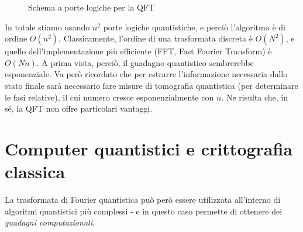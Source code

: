 \documentclass[../../InformazioneQuantistica.tex]{subfiles}
\begin{document}
\begin{figure}[H]
    \centering
    \caption{Schema a porte logiche per la QFT\label{fig:QFT-gates}}
\end{figure}

In totale stiamo usando $n^2$ porte logiche quantistiche, e perciò l'algoritmo è di ordine $O(n^2)$. Classicamente, l'ordine di una trasformata discreta è $O(N^2)$, e quello dell'implementazione più efficiente (FFT, Fast Fourier Transform) è $O(Nn)$. A prima vista, perciò, il guadagno quantistico sembrerebbe esponenziale. Va però ricordato che per estrarre l'informazione necessaria dallo stato finale sarà necessario fare misure di tomografia quantistica (per determinare le fasi relative), il cui numero cresce esponenzialmente con $n$. Ne risulta che, in sé, la QFT non offre particolari vantaggi. 

\section{Computer quantistici e crittografia classica}
La trasformata di Fourier quantistica può però essere utilizzata all'interno di algoritmi quantistici più complessi - e in questo caso permette di ottenere dei \textit{guadagni computazionali}.\\
\end{document}

